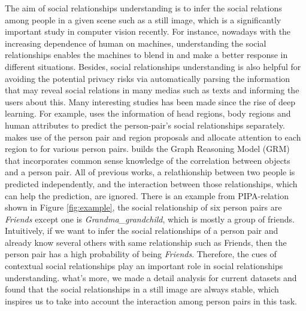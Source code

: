 \documentclass{article}
\begin{document}
The aim of social relationships understanding is to infer the social relations among people in a given scene such as a still image, which is a significantly important study in computer vision recently. For instance, nowadays with the increasing dependence of human on machines, understanding the social relationships enables the machines to blend in and make a better response in different situations. Besides, social relationships understanding is also helpful for avoiding the potential privacy risks via automatically parsing the information that may reveal social relations in many medias such as texts \cite{article} and informing the users about this. Many interesting studies has been made since the rise of deep learning. For example, \cite{DBLP:conf/cvpr/SunSF17} uses the information of head regions, body regions and human attributes to predict the person-pair's social relationships separately. \cite{DBLP:conf/iccv/LiWZK17} makes use of the person pair and region proposals and allocate attention to each region to for various person pairs. \cite{DBLP:conf/ijcai/WangCRYCL18} builds the Graph Reasoning Model (GRM) that incorporates common sense knowledge of the correlation between objects and a person pair. 
All of previous works, a relathionship between two people is predicted independently, and the interaction between those relationships, which can help the prediction, are ignored. 
There is an example from PIPA-relation \cite{DBLP:conf/cvpr/SunSF17} shown in Figure \ref{fig:example}, the social relationship of six person pairs are {\it Friends} except one is {\it Grandma\_grandchild}, which is mostly a group of friends. Intuitively, if we want to infer the social relationships of a person pair and already know several others with same relationship such as Friends, then the person pair has a high probability of being {\it Friends}. Therefore, the cues of contextual social relationships play an important role in social relationships understanding. 
what's more, we made a detail analysis for current datasets and found that the social relationships in a still image are always stable, which inspires us to take into account the interaction among person pairs in this task.
\vspace*{-1mm}
\end{document}
